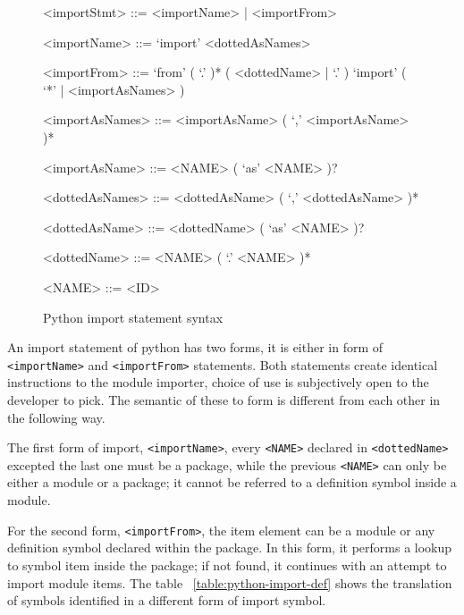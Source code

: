 \begin{figure}[ht]
    \begin{framed}
        \begin{grammar}
            <importStmt>
            ::= <importName>
            | <importFrom>

            <importName>
            ::= `import' <dottedAsNames>

            <importFrom>
            ::= `from' ( `.' )* ( <dottedName> | `.' ) `import' ( `*' | <importAsNames> )

            <importAsNames>
            ::= <importAsName> ( `,' <importAsName> )*

            <importAsName>
            ::= <NAME> ( `as' <NAME> )?

            <dottedAsNames>
            ::= <dottedAsName> ( `,' <dottedAsName> )*

            <dottedAsName>
            ::= <dottedName> ( `as' <NAME> )?

            <dottedName>
            ::= <NAME> ( `.' <NAME> )*

            <NAME> ::= <ID>
        \end{grammar}
    \end{framed}
    \caption{Python import statement syntax }
    \label{fig:python-import-stmt-syntax}
\end{figure}

An import statement of python has two forms, it is either in form of \texttt{<importName>} and \texttt{<importFrom>} statements. Both statements create identical instructions to the module importer, choice of use is subjectively open to the developer to pick. The semantic of these to form is different from each other in the following way.

The first form of import, \texttt{<importName>}, every \texttt{<NAME>} declared in \texttt{<dottedName>} excepted the last one must be a package, while the previous \texttt{<NAME>} can only be either a module or a package; it cannot be referred to a definition symbol inside a module.

For the second form, \texttt{<importFrom>}, the item element can be a module or any definition symbol declared within the package. In this form, it performs a lookup to symbol item inside the package; if not found, it continues with an attempt to import module items. The table ~\ref{table:python-import-def} shows the translation of symbols identified in a different form of import symbol.

